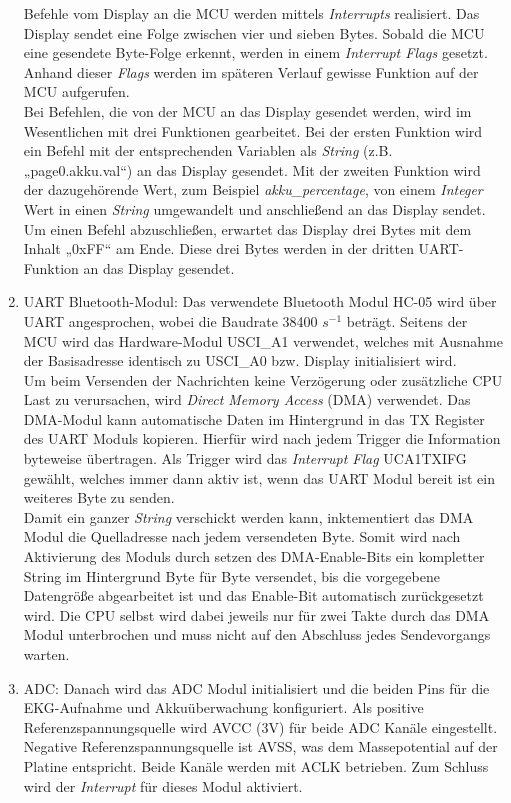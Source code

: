 \begin{enumerate}
    Befehle vom Display an die MCU werden mittels \textit{Interrupts} realisiert. Das Display sendet eine Folge zwischen vier und sieben Bytes. Sobald die MCU eine gesendete Byte-Folge erkennt, werden in einem \textit{Interrupt Flags} gesetzt. Anhand dieser \textit{Flags} werden im späteren Verlauf gewisse Funktion auf der MCU aufgerufen.\\
    Bei Befehlen, die von der MCU an das Display gesendet werden, wird im Wesentlichen mit drei Funktionen gearbeitet. Bei der ersten Funktion wird ein Befehl mit der entsprechenden Variablen als \textit{String} (z.B. „page0.akku.val“) an das Display gesendet. Mit der zweiten Funktion wird der dazugehörende Wert, zum Beispiel \textit{akku\_percentage}, von einem \textit{Integer} Wert in einen \textit{String} umgewandelt und anschließend an das Display sendet. Um einen Befehl abzuschließen, erwartet das Display drei Bytes mit dem Inhalt „0xFF“ am Ende. Diese drei Bytes werden in der dritten UART-Funktion an das Display gesendet.
    \item UART Bluetooth-Modul: Das verwendete Bluetooth Modul HC-05 wird über UART angesprochen, wobei die Baudrate 38400 $s^{-1}$ beträgt. Seitens der MCU wird das Hardware-Modul USCI\_A1 verwendet, welches mit Ausnahme der Basisadresse identisch zu USCI\_A0 bzw. Display initialisiert wird.\\
    Um beim Versenden der Nachrichten keine Verzögerung oder zusätzliche CPU Last zu verursachen, wird \textit{Direct Memory Access} (DMA) verwendet. Das DMA-Modul kann automatische Daten im Hintergrund in das TX Register des UART Moduls kopieren. Hierfür wird nach jedem Trigger die Information byteweise übertragen. Als Trigger wird das \textit{Interrupt Flag} UCA1TXIFG gewählt, welches immer dann aktiv ist, wenn das UART Modul bereit ist ein weiteres Byte zu senden.\\
    Damit ein ganzer \textit{String} verschickt werden kann, inktementiert das DMA Modul die Quelladresse nach jedem versendeten Byte. Somit wird nach Aktivierung des Moduls durch setzen des DMA-Enable-Bits ein kompletter String im Hintergrund Byte für Byte versendet, bis die vorgegebene Datengröße abgearbeitet ist und das Enable-Bit automatisch zurückgesetzt wird. Die CPU selbst wird dabei jeweils nur für zwei Takte durch das DMA Modul unterbrochen und muss nicht auf den Abschluss jedes Sendevorgangs warten.
    \item ADC: Danach wird das ADC Modul initialisiert und die beiden Pins für die EKG-Aufnahme und Akkuüberwachung konfiguriert. Als positive Referenzspannungsquelle wird AVCC (3V) für beide ADC Kanäle eingestellt. Negative Referenzspannungsquelle ist AVSS, was dem Massepotential auf der Platine entspricht. Beide Kanäle werden mit ACLK betrieben. Zum Schluss wird der \textit{Interrupt} für dieses Modul aktiviert.

\end{enumerate}

